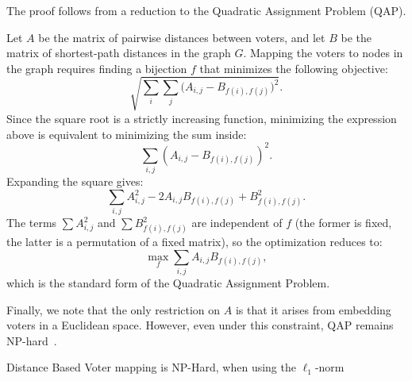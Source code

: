 %
\begin{proofc}{}
  The proof follows from a reduction to the Quadratic Assignment Problem (QAP).

  Let $A$ be the matrix of pairwise distances between voters, and let $B$ be the matrix of shortest-path distances in the graph $G$. Mapping the voters to nodes in the graph requires finding a bijection $f$ that minimizes the following objective:
  $$
    \sqrt{\sum_{i} \sum_{j} \bigl(A_{i,j} - B_{f(i),f(j)}\bigr)^2}.
  $$
  Since the square root is a strictly increasing function, minimizing the expression above is equivalent to minimizing the sum inside:
  $$
    \sum_{i,j} (A_{i,j} - B_{f(i),f(j)})^2.
  $$
  Expanding the square gives:
  $$
    \sum_{i,j} A_{i,j}^2 - 2 A_{i,j} B_{f(i),f(j)} + B_{f(i),f(j)}^2.
  $$
  The terms $\sum A_{i,j}^2$ and $\sum B_{f(i),f(j)}^2$ are independent of $f$ (the former is fixed, the latter is a permutation of a fixed matrix), so the optimization reduces to:
  $$
    \max_f \sum_{i,j} A_{i,j} B_{f(i),f(j)},
  $$
  which is the standard form of the Quadratic Assignment Problem.

  Finally, we note that the only restriction on $A$ is that it arises from embedding voters in a Euclidean space. However, even under this constraint, QAP remains NP-hard~\cite{queyrannePerformanceRatioPolynomial1986}.
\end{proofc}
\begin{corollary}{}
	Distance Based Voter mapping is NP-Hard, when using the $\ell_1$-norm
\end{corollary}

